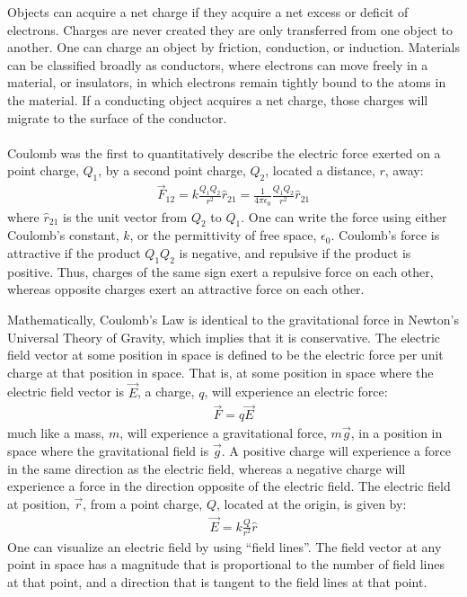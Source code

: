 \vspace{-0.9cm}
\bigskip
\begin{chapterSummary}
Objects can acquire a net charge if they acquire a net excess or deficit of electrons. Charges are never created they are only transferred from one object to another. One can charge an object by friction, conduction, or induction. Materials can be classified broadly as conductors, where electrons can move freely in a material, or insulators, in which electrons remain tightly bound to the atoms in the material. If a conducting object acquires a net charge, those charges will migrate to the surface of the conductor.\\
\\
Coulomb was the first to quantitatively describe the electric force exerted on a point charge, $Q_1$, by a second point charge, $Q_2$, located a distance, $r$, away:
\begin{align*}
\vec F_{12}=k\frac{Q_1Q_2}{r^2}\hat r_{21}=\frac{1}{4\pi\epsilon_0}\frac{Q_1Q_2}{r^2}\hat r_{21}
\end{align*}
where $\hat r_{21}$ is the unit vector from  $Q_2$ to $Q_1$. One can write the force using either Coulomb's constant, $k$, or the permittivity of free space, $\epsilon_0$. Coulomb's force is attractive if the product $Q_1Q_2$ is negative, and repulsive if the product is positive. Thus, charges of the same sign exert a repulsive force on each other, whereas opposite charges exert an attractive force on each other. 

Mathematically, Coulomb's Law is identical to the gravitational force in Newton's Universal Theory of Gravity, which implies that it is conservative. The electric field vector at some position in space is defined to be the electric force per unit charge at that position in space. That is, at some position in space where the electric field vector is $\vec E$, a charge, $q$, will experience an electric force:
\begin{align*}
\vec F=q\vec E
\end{align*} 
much like a mass, $m$, will experience a gravitational force, $m\vec g$, in a position in space where the gravitational field is $\vec g$. A positive charge will experience a force in the same direction as the electric field, whereas a negative charge will experience a force in the direction opposite of the electric field. The electric field at position, $\vec r$, from a point charge, $Q$, located at the origin, is given by:
\begin{align*}
\vec E = k\frac{Q}{r^2}\hat r
\end{align*}
One can visualize an electric field by using ``field lines''. The field vector at any point in space has a magnitude that is proportional to the number of field lines at that point, and a direction that is tangent to the field lines at that point.


\end{chapterSummary}
